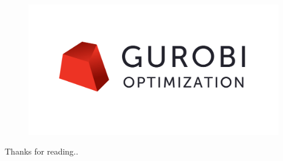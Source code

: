 \documentclass[
  letterpaper,
  DIV=11,
  numbers=noendperiod]{scrreprt}
\begin{document}
\begin{figure}

{\centering \includegraphics{./images/Gurobi_Logo.png}

}

\end{figure}

Thanks for reading..
\end{document}
